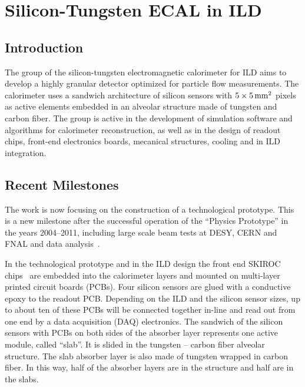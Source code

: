 \section{Silicon-Tungsten ECAL in ILD}

\subsection{Introduction}
The group of the silicon-tungsten electromagnetic calorimeter for ILD aims to develop a highly
granular detector optimized for particle flow measurements. The calorimeter uses a
sandwich architecture of silicon sensors with $\unit[5\times5]{mm^2}$ pixels as active elements embedded in an
alveolar structure made of tungsten and carbon fiber. The group is active in the development of
simulation software and algorithms for calorimeter reconstruction, as well as in the design of readout
chips, front-end electronics boards, mecanical structures, cooling and in ILD
integration.

\subsection{Recent Milestones}
The work is now focusing on the construction of a technological prototype. This
is a new milestone after the successful operation of the “Physics Prototype” in the
years 2004--2011, including large scale beam tests at DESY, CERN and FNAL and data
analysis~\cite{1748-0221-3-08-P08001,2009JPhCS.160a2065B,2010JInst...5T5007A,Adloff201197,1748-0221-6-07-P07005}.

In the technological prototype and in the ILD design the front end SKIROC
chips~\cite{1748-0221-6-12-C12040,Amjad201578} are embedded into the calorimeter layers and mounted on
multi-layer printed circuit boards (PCBs). Four silicon sensors are glued with
a conductive epoxy to the readout PCB. Depending on the ILD and the silicon
sensor sizes, up to about ten of these PCBs will be connected together in-line
and read out from one end by a data acquisition (DAQ) electronics. The sandwich
of the silicon sensors with PCBs on both sides of the absorber layer
represents one active module, called ``slab''. It is slided in the tungsten --
carbon fiber alveolar structure. The slab absorber layer is also made of
tungsten wrapped in carbon fiber. In this way, half of the absorber layers are
in the structure and half are in the slabs.

